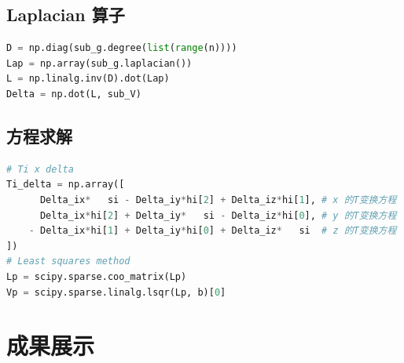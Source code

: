 \documentclass[lang=cn,11pt,a4paper]{elegantpaper}
\begin{document}
\subsection{Laplacian 算子}

\begin{lstlisting}[language=Python]
D = np.diag(sub_g.degree(list(range(n))))
Lap = np.array(sub_g.laplacian())
L = np.linalg.inv(D).dot(Lap)
Delta = np.dot(L, sub_V)
\end{lstlisting}

\subsection{方程求解}

\begin{lstlisting}[language=Python]
# Ti x delta
Ti_delta = np.array([
      Delta_ix*   si - Delta_iy*hi[2] + Delta_iz*hi[1], # x 的T变换方程
      Delta_ix*hi[2] + Delta_iy*   si - Delta_iz*hi[0], # y 的T变换方程
    - Delta_ix*hi[1] + Delta_iy*hi[0] + Delta_iz*   si  # z 的T变换方程
])
# Least squares method
Lp = scipy.sparse.coo_matrix(Lp)
Vp = scipy.sparse.linalg.lsqr(Lp, b)[0]
\end{lstlisting}

\section{成果展示}
\end{document}
